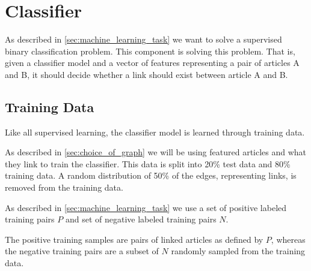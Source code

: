 \section{Classifier}
As described in \cref{sec:machine_learning_task} we want to solve a supervised binary classification problem. This component is solving this problem. That is, given a classifier model and a vector of features representing a pair of articles A and B, it should decide whether a link should exist between article A and B.

\subsection{Training Data}
Like all supervised learning, the classifier model is learned through training data.

As described in \ref{sec:choice_of_graph} we will be using featured articles and what they link to train the classifier. This data is split into 20\% test data and 80\% training data. A random distribution of 50\% of the edges, representing links, is removed from the training data.


As described in \cref{sec:machine_learning_task} we use a set of positive labeled training pairs $P$ and set of negative labeled training pairs $N$.


The positive training samples are pairs of linked articles as defined by $P$, whereas the negative training pairs are a subset of $N$ randomly sampled from the training data.


